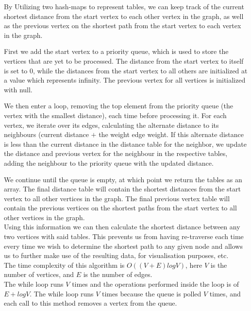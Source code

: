 \documentclass[a4paper]{article}
\begin{document}
By Utilizing two hash-maps to represent tables, we can
keep track of the current shortest distance from the start vertex to each other vertex in the graph,
as well as the previous vertex on the shortest path from the start vertex to each vertex in the graph.

First we add the start vertex to a priority queue,
which is used to store the vertices that are yet to be processed. 
The distance from the start vertex to itself is set to 0, 
while the distances from the start vertex to all others are initialized at a value which represents infinity. 
The previous vertex for all vertices is initialized with null.

We then enter a loop, removing the top element from the priority queue
(the vertex with the smallest distance), each time before processing it. 
For each vertex, we iterate over its edges, calculating the alternate distance to its neighbours 
(current distance $+$ the weight edge weight.
If this alternate distance is less than the current distance in the distance table for the neighbor, 
we update the distance and previous vertex for the neighbour in the respective tables, adding
the neighbour to the priority queue with the updated distance.
\newpage

\vspace*{-2cm}
We continue until the queue is empty,
at which point we return the tables as an array. 
The final distance table will contain the shortest distances from the start vertex to all other vertices in the graph.
The final previous vertex table will contain the previous vertices on the shortest paths from the start vertex to all other vertices in the graph. \\

Using this information we can then calculate the shortest distance between any two vertices with said tables. 
This prevents us from having re-traverse each time every time we wish to determine the shortest path to any given node 
and allows us to further make use of the resulting data, for visualisation purposes, etc. \\

The time complexity of this algorithm is $O((V + E)logV)$,
here $V$ is the number of vertices, and $E$ is the number of edges. \\

The while loop runs $V$ times and the operations performed inside the loop is of $E+logV$. 
The while loop runs $V$ times because the queue is polled $V$ times, 
and each call to this method removes a vertex from the queue. \\
\end{document}
